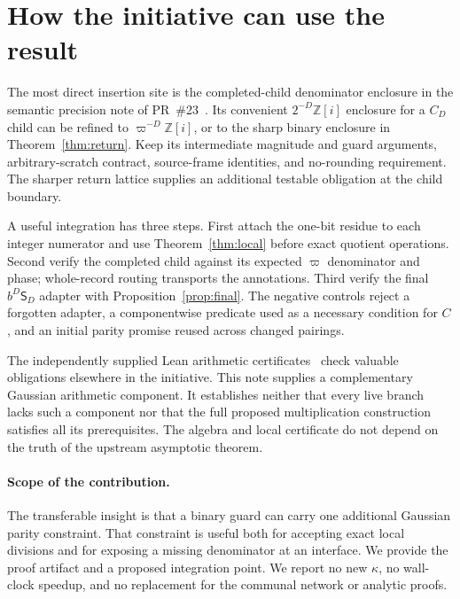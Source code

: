\documentclass[11pt]{article}
\theoremstyle{definition}\newtheorem{definition}[theorem]{Definition}
\theoremstyle{remark}\newtheorem{remark}[theorem]{Remark}
\newcommand{\G}{\mathbb Z[i]}
\newcommand{\p}{\varpi}
\begin{document}
\section{How the initiative can use the result}
The most direct insertion site is the completed-child denominator enclosure in the semantic precision note of PR~\#23~\cite{chen}. Its convenient $2^{-D}\G$ enclosure for a $C_D$ child can be refined to $\p^{-D}\G$, or to the sharp binary enclosure in Theorem~\ref{thm:return}. Keep its intermediate magnitude and guard arguments, arbitrary-scratch contract, source-frame identities, and no-rounding requirement. The sharper return lattice supplies an additional testable obligation at the child boundary.

A useful integration has three steps. First attach the one-bit residue to each integer numerator and use Theorem~\ref{thm:local} before exact quotient operations. Second verify the completed child against its expected $\p$ denominator and phase; whole-record routing transports the annotations. Third verify the final $b^D\mathsf S_D$ adapter with Proposition~\ref{prop:final}. The negative controls reject a forgotten adapter, a componentwise predicate used as a necessary condition for $C$, and an initial parity promise reused across changed pairings.

The independently supplied Lean arithmetic certificates~\cite{pr26,jain} check valuable obligations elsewhere in the initiative. This note supplies a complementary Gaussian arithmetic component. It establishes neither that every live branch lacks such a component nor that the full proposed multiplication construction satisfies all its prerequisites. The algebra and local certificate do not depend on the truth of the upstream asymptotic theorem.

\paragraph{Scope of the contribution.}
The transferable insight is that a binary guard can carry one additional Gaussian parity constraint. That constraint is useful both for accepting exact local divisions and for exposing a missing denominator at an interface. We provide the proof artifact and a proposed integration point. We report no new $\kappa$, no wall-clock speedup, and no replacement for the communal network or analytic proofs.
\end{document}
